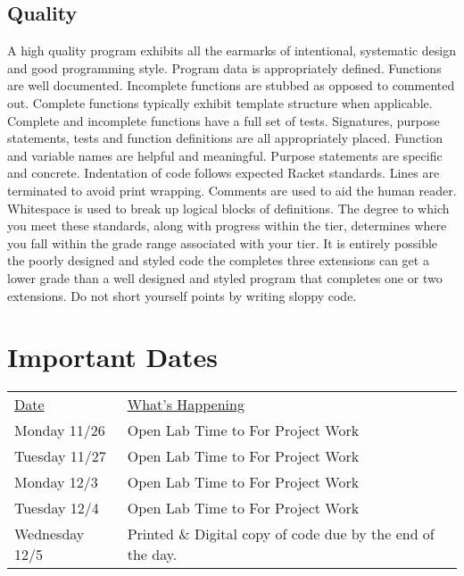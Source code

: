 \documentclass[nobib]{tufte-handout}
\begin{document}
\subsection*{Quality}

A high quality program exhibits all the earmarks of intentional, systematic design and good programming style. Program data is appropriately defined. Functions are well documented. Incomplete functions are stubbed as opposed to commented out. Complete functions typically exhibit template structure when applicable. Complete and incomplete functions have a full set of tests. Signatures, purpose statements, tests and function definitions are all appropriately placed.  Function and variable names are helpful and meaningful. Purpose statements are specific and concrete. Indentation of code follows expected Racket standards. Lines are terminated to avoid print wrapping. Comments are used to aid the human reader. Whitespace is used to break up logical blocks of definitions. The degree to which you meet these standards, along with progress within the tier, determines where you fall within the grade range associated with your tier. It is entirely possible the poorly designed and styled code the completes three extensions can get a lower grade than a well designed and styled program that completes one or two extensions. Do not short yourself points by writing sloppy code.


\section*{Important Dates}

\begin{tabular}{ll}
\underline{Date} & \underline{What's Happening} \\
 Monday 11/26 & Open Lab Time to For Project Work \\
 Tuesday 11/27 & Open Lab Time to For Project Work \\
 Monday 12/3 & Open Lab Time to For Project Work \\
 Tuesday 12/4 & Open Lab Time to For Project Work \\
 Wednesday 12/5 & Printed \& Digital copy of code due by the end of the day.
\end{tabular}
\end{document}
